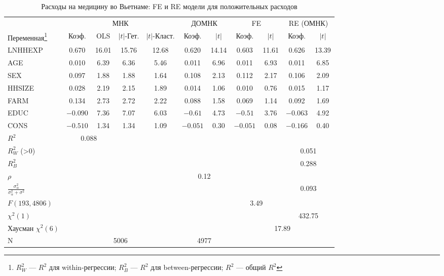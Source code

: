 \begin{sidewaystable}[!htbp]
\caption{\label{tab:vietnamfe} Расходы на медицину во Вьетнаме: FE и RE модели для положительных расходов}
\begin{minipage}{\textwidth}
\begin{center}
\begin{tabular}{lcccccccccc}
\hline
\hline
& \multicolumn{4}{c}{МНК} & \multicolumn{2}{c}{ДОМНК} & \multicolumn{2}{c}{FE} & \multicolumn{2}{c}{RE (ОМНК)} \\
\cmidrule(r){2-5} \cmidrule(r){6-7} \cmidrule(r){8-9} \cmidrule(r){10-11}
Переменная\footnote{$R^2_W$ --- $R^2$ для within-регрессии; $R^2_B$ --- $R^2$ для between-регрессии; $R^2$ --- общий $R^2$} & Коэф. & OLS & $|t|$-Гет. & $|t|$-Класт. & Коэф. & $|t|$ & Коэф. & $|t|$ & Коэф. & $|t|$ \\
\hline
LNHHEXP & 0.670 & 16.01 & 15.76 & 12.68 & 0.620 & 14.14 & 0.603 & 11.61 & 0.626 & 13.39 \\
AGE & 0.010 & 6.39 & 6.36 & 5.46 & 0.011 & 6.96 & 0.011 & 6.93 & 0.011 & 6.85 \\
SEX & 0.097 & 1.88 & 1.88 & 1.64 & 0.108 & 2.13 & 0.112 & 2.17 & 0.106 & 2.09 \\
HHSIZE & 0.028 & 2.19 & 2.15 & 1.89 & 0.014 & 1.06 & 0.010 & 0.76 & 0.015 & 1.17 \\
FARM & 0.134 & 2.73 & 2.72 & 2.22 & 0.088 & 1.58 & 0.069 & 1.14 & 0.092 & 1.69\\
EDUC & $-0.090$ & 7.36 & 7.07 & 6.03 & $-0.61$ & 4.73 & $-0.51$ & 3.76 & $-0.063$ & 4.92 \\
CONS & $-0.510$ & 1.34 & 1.34 & 1.09 & $-0.051$ & 0.30 & $-0.051$ & 0.08 & $-0.166$ & 0.40 \\
$R^2$ & \multicolumn{2}{c}{0.088} &  &  &  &  &  &  &  &  \\
$R^2_W$ (>0) & \multicolumn{8}{c}{ } & \multicolumn{2}{c}{0.051} \\
$R^2_B$ & \multicolumn{8}{c}{ } & \multicolumn{2}{c}{0.288} \\
$\rho$ & \multicolumn{4}{c}{ } & \multicolumn{2}{c}{0.12} & \multicolumn{4}{c}{ }\\
$\frac{\sigma^2_{\alpha}}{\sigma^2_{\alpha} + \sigma^2}$ & \multicolumn{8}{c}{ } & \multicolumn{2}{c}{0.093}\\
$F(193, 4806)$ & \multicolumn{6}{c}{ } & \multicolumn{2}{c}{3.49} & \multicolumn{2}{c}{ } \\
$\chi^2(1)$ & \multicolumn{8}{c}{ } & \multicolumn{2}{c}{432.75} \\
Хаусман $\chi^2(6)$ & \multicolumn{6}{c}{ } & \multicolumn{4}{c}{17.89} \\
N & \multicolumn{4}{c}{5006} & \multicolumn{2}{c}{4977} & \multicolumn{4}{c}{ } \\
\hline
\hline
\end{tabular}
\end{center}
\end{minipage}
\end{sidewaystable}


